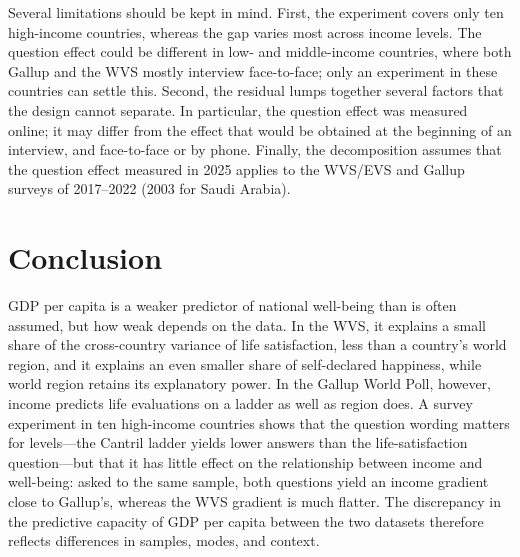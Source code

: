 \documentclass[12pt]{article}
\begin{document}
Several limitations should be kept in mind. First, the experiment covers only ten high-income countries, whereas the gap varies most across income levels. The question effect could be different in low- and middle-income countries, where both Gallup and the WVS mostly interview face-to-face; only an experiment in these countries can settle this. Second, the residual lumps together several factors that the design cannot separate. In particular, the question effect was measured online; it may differ from the effect that would be obtained at the beginning of an interview, and face-to-face or by phone. 
Finally, the decomposition assumes that the question effect measured in 2025 applies to the WVS/EVS and Gallup surveys of 2017--2022 (2003 for Saudi Arabia). %


\section{Conclusion}\label{sec:conclusion}

GDP per capita is a weaker predictor of national well-being than is often assumed, but how weak depends on the data. In the WVS, it explains a small share of the cross-country variance of life satisfaction, less than a country's world region, and it explains an even smaller share of self-declared happiness, while world region retains its explanatory power. 
In the Gallup World Poll, however, income predicts life evaluations on a ladder as well as region does. A survey experiment in ten high-income countries shows that the question wording matters for levels---the Cantril ladder yields lower answers than the life-satisfaction question---but that it has little effect on the relationship between income and well-being: asked to the same sample, both questions yield an income gradient close to Gallup's, whereas the WVS gradient is much flatter. The discrepancy in the predictive capacity of GDP per capita between the two datasets therefore reflects differences in samples, modes, and context.
\end{document}
